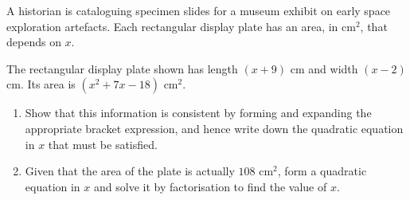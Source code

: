 \begin{question}
\noindent A historian is cataloguing specimen slides for a museum exhibit on early space exploration artefacts. Each rectangular display plate has an area, in cm$^2$, that depends on $x$.

\begin{center}
\end{center}

\noindent The rectangular display plate shown has length $(x + 9)$ cm and width $(x - 2)$ cm.
Its area is $(x^2 + 7x - 18)$ cm$^2$.

\begin{enumerate}
    \item[(a)] Show that this information is consistent by forming and expanding the appropriate bracket expression, and hence write down the quadratic equation in $x$ that must be satisfied.
    \vspace{2.5cm}

    \item[(b)] Given that the area of the plate is actually $108$ cm$^2$, form a quadratic equation in $x$ and solve it by factorisation to find the value of $x$.
    \vspace{5cm}

\end{enumerate}
\end{question}
